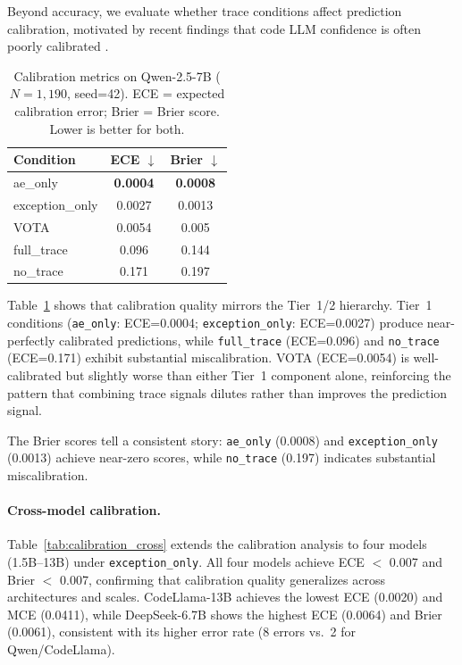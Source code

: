 Beyond accuracy, we evaluate whether trace conditions affect prediction calibration, motivated by recent findings that code LLM confidence is often poorly calibrated \citep{spiess2025calibration}.

\begin{table}[t]
\centering
\caption{Calibration metrics on Qwen-2.5-7B ($N{=}1{,}190$, seed=42). ECE = expected calibration error; Brier = Brier score. Lower is better for both.}
\label{tab:calibration}
\small
\begin{tabular}{lcc}
\toprule
\textbf{Condition} & \textbf{ECE $\downarrow$} & \textbf{Brier $\downarrow$} \\
\midrule
ae\_only & \textbf{0.0004} & \textbf{0.0008} \\
exception\_only & 0.0027 & 0.0013 \\
VOTA & 0.0054 & 0.005 \\
full\_trace & 0.096 & 0.144 \\
no\_trace & 0.171 & 0.197 \\
\bottomrule
\end{tabular}
\end{table}

Table~\ref{tab:calibration} shows that calibration quality mirrors the Tier~1/2 hierarchy.
Tier~1 conditions (\texttt{ae\_only}: ECE=0.0004; \texttt{exception\_only}: ECE=0.0027) produce near-perfectly calibrated predictions, while \texttt{full\_trace} (ECE=0.096) and \texttt{no\_trace} (ECE=0.171) exhibit substantial miscalibration.
VOTA (ECE=0.0054) is well-calibrated but slightly worse than either Tier~1 component alone, reinforcing the pattern that combining trace signals dilutes rather than improves the prediction signal.

The Brier scores tell a consistent story: \texttt{ae\_only} (0.0008) and \texttt{exception\_only} (0.0013) achieve near-zero scores, while \texttt{no\_trace} (0.197) indicates substantial miscalibration.

\paragraph{Cross-model calibration.}
Table~\ref{tab:calibration_cross} extends the calibration analysis to four models (1.5B--13B) under \texttt{exception\_only}.
All four models achieve ECE ${<}$ 0.007 and Brier ${<}$ 0.007, confirming that calibration quality generalizes across architectures and scales.
CodeLlama-13B achieves the lowest ECE (0.0020) and MCE (0.0411), while DeepSeek-6.7B shows the highest ECE (0.0064) and Brier (0.0061), consistent with its higher error rate (8 errors vs.\ 2 for Qwen/CodeLlama).


